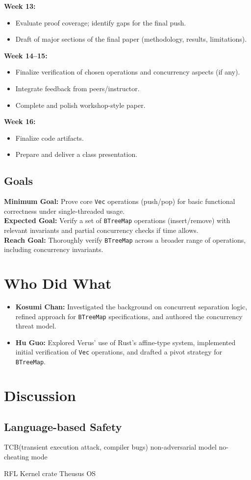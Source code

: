 \documentclass[conference]{IEEEtran}
\begin{document}
\noindent\textbf{Week 13:}
\begin{itemize}
\item Evaluate proof coverage; identify gaps for the final push.
\item Draft of major sections of the final paper (methodology, results, limitations).
\end{itemize}

\noindent\textbf{Week 14--15:}
\begin{itemize}
\item Finalize verification of chosen operations and concurrency aspects (if any).
\item Integrate feedback from peers/instructor.
\item Complete and polish workshop-style paper.
\end{itemize}

\noindent\textbf{Week 16:}
\begin{itemize}
\item Finalize code artifacts.
\item Prepare and deliver a class presentation.
\end{itemize}

\subsection{Goals}
\noindent\textbf{Minimum Goal:} Prove core \texttt{Vec} operations (push/pop) for basic functional correctness under single-threaded usage.\\
\textbf{Expected Goal:} Verify a set of \texttt{BTreeMap} operations (insert/remove) with relevant invariants and partial concurrency checks if time allows.\\
\textbf{Reach Goal:} Thoroughly verify \texttt{BTreeMap} across a broader range of operations, including concurrency invariants.

\section{Who Did What}
\begin{itemize}
\item \textbf{Kosumi Chan:} Investigated the background on concurrent separation logic, refined approach for \texttt{BTreeMap} specifications, and authored the concurrency threat model.
\item \textbf{Hu Guo:} Explored Verus' use of Rust's affine-type system, implemented initial verification of \texttt{Vec} operations, and drafted a pivot strategy for \texttt{BTreeMap}.
\end{itemize}

\section{Discussion}
\subsection{Language-based Safety}
TCB(transient execution attack, compiler bugs)
non-adversarial model 
no-cheating mode 

RFL 
Kernel crate 
Theusus OS 

\printbibliography
\end{document}
